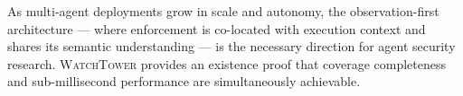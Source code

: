 \documentclass[conference]{IEEEtran}
\begin{document}
As multi-agent deployments grow in scale and autonomy, the observation-first
architecture --- where enforcement is co-located with execution context and
shares its semantic understanding --- is the necessary direction for agent
security research. \textsc{WatchTower} provides an existence proof that
coverage completeness and sub-millisecond performance are simultaneously
achievable.

\balance


\end{document}
